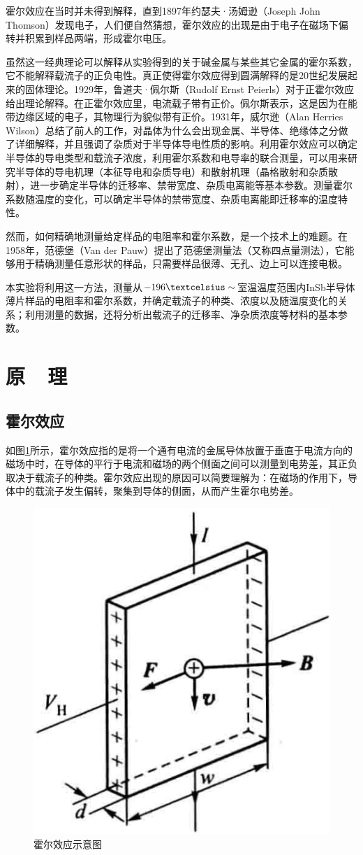 \documentclass{buaaemp}
\begin{document}
霍尔效应在当时并未得到解释，直到1897年约瑟夫·汤姆逊（Joseph John Thomson）发现电子，人们便自然猜想，霍尔效应的出现是由于电子在磁场下偏转并积累到样品两端，形成霍尔电压。



虽然这一经典理论可以解释从实验得到的关于碱金属与某些其它金属的霍尔系数，它不能解释载流子的正负电性。真正使得霍尔效应得到圆满解释的是20世纪发展起来的固体理论。\pagebreak 1929年，鲁道夫·佩尔斯（Rudolf Ernst Peierls）对于正霍尔效应给出理论解释。在正霍尔效应里，电流载子带有正价。佩尔斯表示，这是因为在能带边缘区域的电子，其物理行为貌似带有正价\cite{peierls1929theorie}。1931年，威尔逊（Alan Herries Wilson）总结了前人的工作，对晶体为什么会出现金属、半导体、绝缘体之分做了详细解释，并且强调了杂质对于半导体导电性质的影响\cite{wilson1931theory}。利用霍尔效应可以确定半导体的导电类型和载流子浓度，利用霍尔系数和电导率的联合测量，可以用来研究半导体的导电机理（本征导电和杂质导电）和散射机理（晶格散射和杂质散射），进一步确定半导体的迁移率、禁带宽度、杂质电离能等基本参数。测量霍尔系数随温度的变化，可以确定半导体的禁带宽度、杂质电离能即迁移率的温度特性。
	
然而，如何精确地测量给定样品的电阻率和霍尔系数，是一个技术上的难题。在1958年，范德堡（Van der Pauw）提出了范德堡测量法（又称四点量测法），它能够用于精确测量任意形状的样品，只需要样品很薄、无孔、边上可以连接电极\cite{philips1958method}。
	
本实验将利用这一方法，测量从$-196\textcelsius\sim$室温温度范围内InSb半导体薄片样品的电阻率和霍尔系数，并确定载流子的种类、浓度以及随温度变化的关系；利用测量的数据，还将分析出载流子的迁移率、净杂质浓度等材料的基本参数。

\section{原~~理}
\subsection{霍尔效应}

	如图\ref{halleffect}所示，霍尔效应指的是将一个通有电流的金属导体放置于垂直于电流方向的磁场中时，在导体的平行于电流和磁场的两个侧面之间可以测量到电势差，其正负取决于载流子的种类。霍尔效应出现的原因可以简要理解为：在磁场的作用下，导体中的载流子发生偏转，聚集到导体的侧面，从而产生霍尔电势差。
	\begin{figure}[!htbp]
		\centering
		\includegraphics[width=0.3\linewidth]{./image/halleffect.png}
		\caption{霍尔效应示意图}
		\label{halleffect}
	\end{figure}
\end{document}
